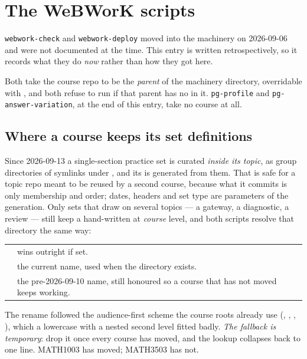 \section{The WeBWorK scripts}\label{sec:ref-webwork}

\texttt{webwork-check} and \texttt{webwork-deploy} moved into the machinery on
2026-09-06 and were not documented at the time. This entry is written
retrospectively, so it records what they do \emph{now} rather than how they got
here.

Both take the course repo to be the \emph{parent} of the machinery directory,
overridable with , and both refuse to run if that parent has
no  in it.
\texttt{pg-profile} and \texttt{pg-answer-variation}, at the end of this entry,
take no course at all.

\subsection*{Where a course keeps its set definitions}

Since 2026-09-13 a single-section practice set is curated \emph{inside its topic}, as group directories of symlinks under , and its  is generated from them.
That is safe for a topic repo meant to be reused by a second course, because what it commits is only membership and order; dates, headers and set type are parameters of the generation.
Only sets that draw on several topics --- a gateway, a diagnostic, a review --- still keep a hand-written  at \emph{course} level, and both scripts resolve that directory the same way:

\begin{center}
\begin{tabularx}{\linewidth}{@{}l Y@{}}
 & wins outright if set.\\
 & the current name, used when the directory exists.\\
 & the pre-2026-09-10 name, still
  honoured so a course that has not moved keeps working.\\
\end{tabularx}
\end{center}

The rename followed the audience-first scheme the course roots already use
(, , , ), which a
lowercase  with a nested second level fitted badly.
\emph{The fallback is temporary}: drop it once every course has moved, and the
lookup collapses back to one line. MATH1003 has moved; MATH3503 has not.

